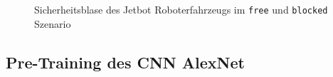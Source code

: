 \begin{figure}[H]
    \centering
    \caption[Safety Bubble des Jetbot]{Sicherheitsblase des Jetbot Roboterfahrzeugs im \texttt{free} und \texttt{blocked} Szenario}
    \label{fig:Bild4.2}
\end{figure}

\subsection{Pre-Training des CNN AlexNet}

